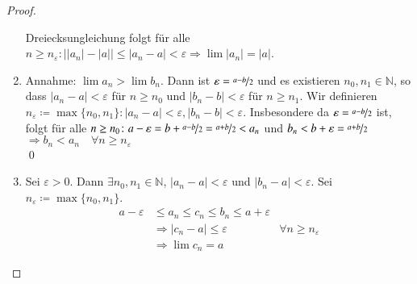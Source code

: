 \documentclass[ngerman,titlepage,twoside, parskip=half*]{scrreprt}
\newcommand*{\N}{\mathbb{N}}
\theoremstyle{plain}
\theoremstyle{definition}
\theoremstyle{remark}
\newcommand*{\abs}[2][]{#1\lvert#2#1\rvert}
\begin{document}
\begin{proof}
\begin{enumerate}
  Dreiecksungleichung folgt für alle $n\geq n_\varepsilon\colon
  \abs{\abs{a_n}-\abs{a}} \leq \abs{a_n-a} < \varepsilon \Rightarrow
  \lim \abs{a_n} =\abs{a}$.
\item Annahme: $\lim a_n > \lim b_n$. Dann ist $\varepsilon =
  \nicefrac{a-b}{2}$ und es existieren $n_0,n_1 \in \N$, so dass
  $\abs{a_n-a} < \varepsilon$ für $n \geq n_0$ und $\abs{b_n-b} < \varepsilon$
  für $n \geq n_1$. Wir definieren $n_{\varepsilon} \coloneqq \max
  \{n_0,n_1\}\colon\abs{a_n-a}<\varepsilon, \abs{b_n-b}<\varepsilon$. Insbesondere
  da $\varepsilon = \nicefrac{a-b}{2}$ ist, folgt für alle $n\geq n_0\colon
  a-\varepsilon = b + \nicefrac{a-b}{2}= \nicefrac{a+b}{2}<a_n$ und
  $b_n<b+\varepsilon=\nicefrac{a+b}{2}$
  $\Rightarrow b_n < a_n \quad \forall n \geq n_{\varepsilon}$\lightning\\
  \qed
\item Sei $\varepsilon > 0$. Dann $\exists n_0, n_1 \in \N$,
  $\abs{a_n-a}<\varepsilon$ und $\abs{b_n-a}<\varepsilon$. Sei
  $n_{\varepsilon}\coloneqq \max \{n_0,n_1\}$.
  \begin{align*}
    a-\varepsilon &\leq a_n \leq c_n \leq b_n \leq a+\varepsilon\\
    &\Rightarrow \abs{c_n-a} \leq \varepsilon & \forall n \geq n_{\varepsilon}\\
    &\Rightarrow \lim c_n = a
  \end{align*}
\end{enumerate}
\end{proof}
\end{document}
